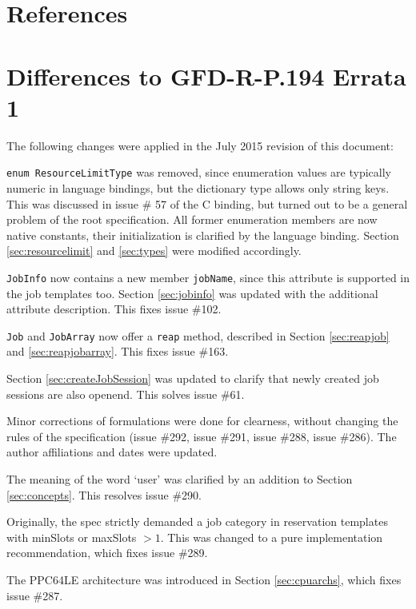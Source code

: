 \documentclass{article}
\newcommand{\h}[1]{\lstinline|#1|}
\begin{document}
\section{References}
\renewcommand{\refname}{}
\vspace*{-3em}


\newpage
\appendix

\section{Differences to GFD-R-P.194 Errata 1}
\label{sec:errata2}

The following changes were applied in the July 2015 revision of this document:

\lstinline{enum ResourceLimitType} was removed, since enumeration values are typically numeric in language bindings, but the dictionary type allows only string keys. This was discussed in issue \# 57 of the C binding, but turned out to be a general problem of the root specification. All former enumeration members are now native constants, their initialization is clarified by the language binding. Section \ref{sec:resourcelimit} and \ref{sec:types} were modified accordingly.

\h{JobInfo} now contains a new member \h{jobName}, since this attribute is supported in the job templates too. Section \ref{sec:jobinfo} was updated with the additional attribute description. This fixes issue \#102.

\h{Job} and \h{JobArray} now offer a \h{reap} method, described in Section \ref{sec:reapjob} and \ref{sec:reapjobarray}. This fixes issue \#163.

Section \ref{sec:createJobSession} was updated to clarify that newly created job sessions are also openend. This solves issue \#61.

Minor corrections of formulations were done for clearness, without changing the rules of the specification (issue \#292, issue \#291, issue \#288, issue \#286). The author affiliations and dates were updated.

The meaning of the word `user' was clarified by an addition to Section \ref{sec:concepts}. This resolves issue \#290.

Originally, the spec strictly demanded a job category in reservation templates with minSlots or maxSlots $> 1$. This was changed to a pure implementation recommendation, which fixes issue \#289.

The PPC64LE architecture was introduced in Section \ref{sec:cpuarchs}, which fixes issue \#287.
\end{document}
